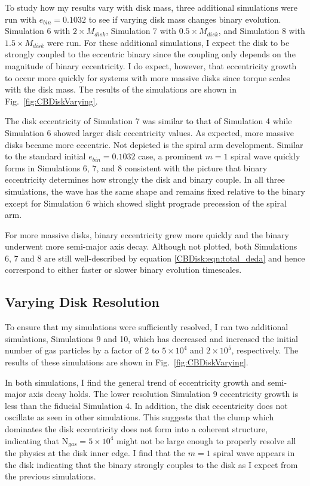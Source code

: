 To study how my results vary with disk mass, three additional simulations were run with $e_{bin} =
0.1032$ to see if varying disk mass changes binary evolution.  Simulation 6
with $2 \times M_{disk}$, Simulation 7 with $0.5 \times M_{disk}$, and
Simulation 8 with $1.5 \times M_{disk}$ were run.  For these additional simulations, I expect the disk to be strongly coupled to the eccentric binary since the 
coupling only depends on the magnitude of binary eccentricity.  I do expect, however, that eccentricity growth to occur more quickly for systems with more 
massive disks since torque scales with the disk mass.  The results of the simulations are shown in Fig.~\ref{fig:CBDiskVarying}.

The disk eccentricity of Simulation 7 was similar to that of Simulation 4 while Simulation 6 showed larger disk eccentricity values.  As expected, more massive 
disks became more eccentric.  Not depicted is the spiral arm development.  Similar to the standard initial $e_{bin} = 0.1032$ case, a prominent $m = 1$ spiral 
wave quickly forms in Simulations 6, 7, and 8 consistent with the picture that binary eccentricity determines how strongly the disk and binary couple.  In all three 
simulations, the wave has the same shape and remains fixed relative to the binary except for Simulation 6 which showed slight prograde precession of the 
spiral arm.  

For more massive disks, binary eccentricity grew more quickly and the binary underwent more semi-major axis decay.  Although not plotted, both Simulations 6, 7 and 8 are still well-described by equation \ref{CBDisk:eqn:total_deda} and hence correspond to
either faster or slower binary evolution timescales.  


\subsection{Varying Disk Resolution} \label{CBDisk:sec:VaryingDiscResolution}

To ensure that my simulations were sufficiently resolved, I ran two additional simulations, Simulations 9 and 10, which has decreased and increased
 the initial number of gas particles by a factor of 2 to $5 \times 10^4$ and $2 \times 10^5$, respectively.  The results of these simulations are shown in Fig.~\ref{fig:CBDiskVarying}.
 
 In both simulations, I find the general trend of eccentricity growth and semi-major axis decay holds.  The lower resolution Simulation 9 eccentricity 
 growth is less than the fiducial Simulation 4.  In addition, the disk eccentricity does not oscillate as seen in other simulations.  This suggests that the clump 
 which dominates the disk eccentricity does not form into a coherent structure, indicating that N$_{gas} = 5 \times 
 10^4$ might not be large enough to properly resolve all the physics at the disk inner edge.  I find that the $m = 1$ spiral wave appears in the disk indicating 
 that the binary strongly couples to the disk as I expect from the previous simulations.
 
